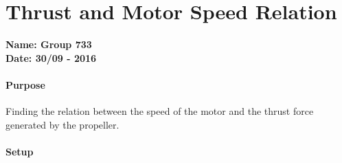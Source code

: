 \chapter{Thrust and Motor Speed Relation}\label{app:potentiometerLin} 
\textbf{Name: Group 733}\\
\textbf{Date: 30/09 - 2016}

\subsubsection{Purpose}
Finding the relation between the speed of the motor and the thrust force generated by the propeller.

\subsubsection{Setup}

